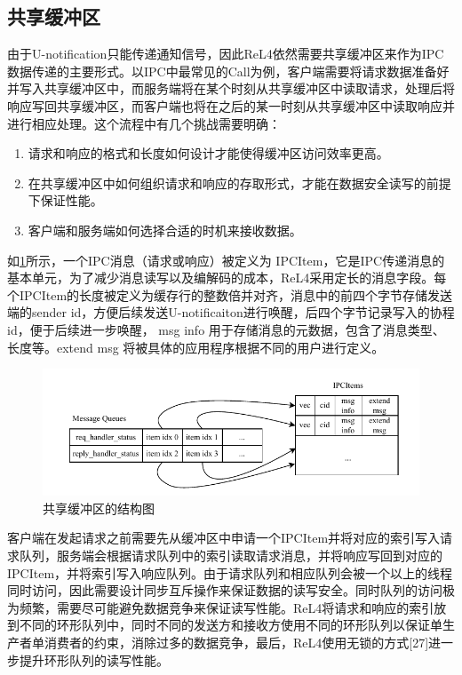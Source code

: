 \subsection{共享缓冲区}
由于U-notification只能传递通知信号，因此ReL4依然需要共享缓冲区来作为IPC数据传递的主要形式。以IPC中最常见的Call为例，客户端需要将请求数据准备好并写入共享缓冲区中，而服务端将在某个时刻从共享缓冲区中读取请求，处理后将响应写回共享缓冲区，而客户端也将在之后的某一时刻从共享缓冲区中读取响应并进行相应处理。这个流程中有几个挑战需要明确：
\begin{enumerate}
  \item 请求和响应的格式和长度如何设计才能使得缓冲区访问效率更高。
  \item 在共享缓冲区中如何组织请求和响应的存取形式，才能在数据安全读写的前提下保证性能。
  \item 客户端和服务端如何选择合适的时机来接收数据。
\end{enumerate}

如\ref{fig:ipcitem}所示，一个IPC消息（请求或响应）被定义为 IPCItem，它是IPC传递消息的基本单元，为了减少消息读写以及编解码的成本，ReL4采用定长的消息字段。每个IPCItem的长度被定义为缓存行的整数倍并对齐，消息中的前四个字节存储发送端的sender id，方便后续发送U-notificaiton进行唤醒，后四个字节记录写入的协程id，便于后续进一步唤醒， msg info 用于存储消息的元数据，包含了消息类型、长度等。extend msg 将被具体的应用程序根据不同的用户进行定义。

\begin{figure}[htbp]
  \centering
  \includegraphics[width=1.0\textwidth]{figures/IPCItem.drawio.pdf}
  \caption{共享缓冲区的结构图}\label{fig:ipcitem}
\end{figure}

客户端在发起请求之前需要先从缓冲区中申请一个IPCItem并将对应的索引写入请求队列，服务端会根据请求队列中的索引读取请求消息，并将响应写回到对应的IPCItem，并将索引写入响应队列。由于请求队列和相应队列会被一个以上的线程同时访问，因此需要设计同步互斥操作来保证数据的读写安全。同时队列的访问极为频繁，需要尽可能避免数据竞争来保证读写性能。ReL4将请求和响应的索引放到不同的环形队列中，同时不同的发送方和接收方使用不同的环形队列以保证单生产者单消费者的约束，消除过多的数据竞争，最后，ReL4使用无锁的方式[27]进一步提升环形队列的读写性能。

